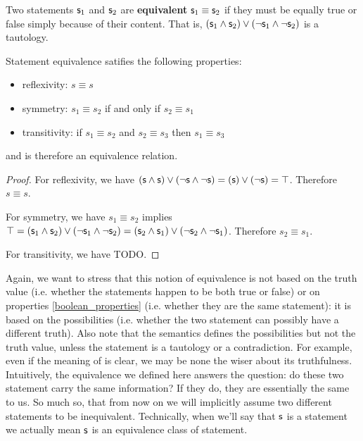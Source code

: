 \documentclass[11pt,letterpaper,fleqn]{memoir} %
\begin{document}
\begin{mathSection}

\begin{defn}
	Two statements $\mathsf{s}_1$ and $\mathsf{s}_2$ are \textbf{equivalent} $\mathsf{s}_1 \equiv \mathsf{s}_2$ if they must be equally true or false simply because of their content. That is, $(\mathsf{s}_1 \wedge \mathsf{s}_2) \vee (\neg\mathsf{s}_1 \wedge \neg\mathsf{s}_2)$ is a tautology.
\end{defn}

\begin{prop}
	Statement equivalence satifies the following properties:
	\begin{itemize}
		\item reflexivity: $s \equiv s$
		\item symmetry: $s_1 \equiv s_2$ if and only if $s_2 \equiv s_1$
		\item transitivity: if $s_1 \equiv s_2$ and $s_2 \equiv s_3$ then $s_1 \equiv s_3$
	\end{itemize}
	and is therefore an equivalence relation.
\end{prop}
\begin{proof}
	For reflexivity, we have $(\mathsf{s} \wedge \mathsf{s}) \vee (\neg\mathsf{s} \wedge \neg\mathsf{s}) = (\mathsf{s}) \vee (\neg\mathsf{s}) = \top$. Therefore $s \equiv s$.
	
	For symmetry, we have $s_1 \equiv s_2$ implies $\top = (\mathsf{s}_1 \wedge \mathsf{s}_2) \vee (\neg\mathsf{s}_1 \wedge \neg\mathsf{s}_2) = (\mathsf{s}_2 \wedge \mathsf{s}_1) \vee (\neg\mathsf{s}_2 \wedge \neg\mathsf{s}_1)$. Therefore $s_2 \equiv s_1$.
	
	For transitivity, we have TODO.
\end{proof}

\end{mathSection}

Again, we want to stress that this notion of equivalence is not based on the truth value (i.e. whether the statements happen to be both true or false) or on properties \ref{boolean_properties} (i.e. whether they are the same statement): it is based on the possibilities (i.e. whether the two statement can possibly have a different truth). Also note that the semantics defines the possibilities but not the truth value, unless the statement is a tautology or a contradiction. For example, even if the meaning of  is clear, we may be none the wiser about its truthfulness. Intuitively, the equivalence we defined here answers the question: do these two statement carry the same information? If they do, they are essentially the same to us. So much so, that from now on we will implicitly assume two different statements to be inequivalent. Technically, when we'll say that $\mathsf{s}$ is a statement we actually mean $\mathsf{s}$ is an equivalence class of statement.
\end{document}
